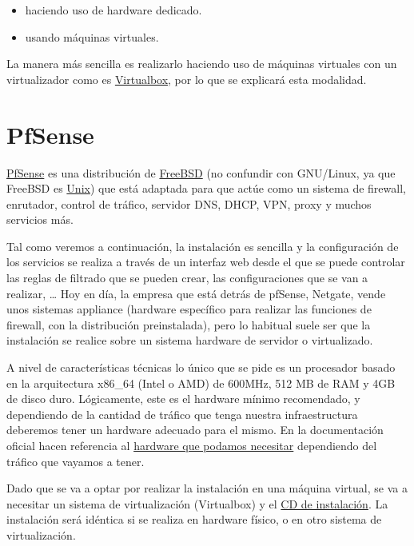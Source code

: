 \begin{itemize}
    \item haciendo uso de hardware dedicado.
    \item usando máquinas virtuales.
\end{itemize}

La manera más sencilla es realizarlo haciendo uso de máquinas virtuales con un virtualizador como es \href{https://www.virtualbox.org/}{Virtualbox}, por lo que se explicará esta modalidad.


\chapter{PfSense}
\href{https://www.pfsense.org/}{PfSense} es una distribución de \href{https://es.wikipedia.org/wiki/FreeBSD}{FreeBSD} (no confundir con GNU/Linux, ya que FreeBSD es \href{https://es.wikipedia.org/wiki/Unix}{Unix}) que está adaptada para que actúe como un sistema de firewall, enrutador, control de tráfico, servidor DNS, DHCP, VPN, proxy y muchos servicios más.

Tal como veremos a continuación, la instalación es sencilla y la configuración de los servicios se realiza a través de un interfaz web desde el que se puede controlar las reglas de filtrado que se pueden crear, las configuraciones que se van a realizar, …
Hoy en día, la empresa que está detrás de pfSense, Netgate, vende unos sistemas appliance (hardware específico para realizar las funciones de firewall, con la distribución preinstalada), pero lo habitual suele ser que la instalación se realice sobre un sistema hardware de servidor o virtualizado.

A nivel de características técnicas lo único que se pide es un procesador basado en la arquitectura x86\_64 (Intel o AMD) de 600MHz, 512 MB de RAM y 4GB de disco duro. Lógicamente, este es el hardware mínimo recomendado, y dependiendo de la cantidad de tráfico que tenga nuestra infraestructura deberemos tener un hardware adecuado para el mismo. En la documentación oficial hacen referencia al \href{https://docs.netgate.com/pfsense/en/latest/hardware/size.html}{hardware que podamos necesitar} dependiendo del tráfico que vayamos a tener.

Dado que se va a optar por realizar la instalación en una máquina virtual, se va a necesitar un sistema de virtualización (Virtualbox) y el \href{https://www.pfsense.org/download/}{CD de instalación}. La instalación será idéntica si se realiza en hardware físico, o en otro sistema de virtualización.


